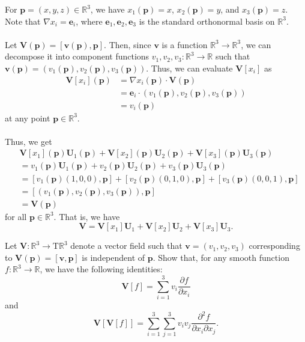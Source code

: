 \documentclass[12 pt, letterpaper]{hmcpset}
\begin{document}
\begin{solution}
	For $\mathbf p = (x, y, z) \in \mathbb R^3$, we have $x_1(\mathbf p) = x$, $x_2(\mathbf p) = y$, and $x_3(\mathbf p) = z$. Note that $\nabla x_i = \mathbf e_i$, where $\mathbf e_1, \mathbf e_2, \mathbf e_3$ is the standard orthonormal basis on $\mathbb R^3$. \\\\
	Let $\mathbf V(\mathbf p) = [\mathbf v(\mathbf p), \mathbf p]$. Then, since $\mathbf v$ is a function $\mathbb R^3 \to \mathbb R^3$, we can decompose it into component functions $v_1, v_2, v_3 : \mathbb R^3 \to \mathbb R$ such that $\mathbf v(\mathbf p) = (v_1(\mathbf p), v_2(\mathbf p), v_3(\mathbf p))$. Thus, we can evaluate $\mathbf V[x_i]$ as
	\[
		\begin{split}
			\mathbf V[x_i](\mathbf p) & = \nabla x_i(\mathbf p) \cdot \mathbf V(\mathbf p) \\
						  & = \mathbf e_i \cdot (v_1(\mathbf p), v_2(\mathbf p), v_3(\mathbf p)) \\
						  & = v_i(\mathbf p)
		\end{split}
	\]
	at any point $\mathbf p \in \mathbb R^3$. \\\\
	Thus, we get
	\[
		\begin{split}
			& \mathbf V[x_1] (\mathbf p) \mathbf U_1 (\mathbf p) + \mathbf V[x_2] (\mathbf p) \mathbf U_2 (\mathbf p) + \mathbf V[x_3] (\mathbf p) \mathbf U_3 (\mathbf p) \\
			& = v_1 (\mathbf p) \mathbf U_1 (\mathbf p) + v_2 (\mathbf p) \mathbf U_2 (\mathbf p) + v_3 (\mathbf p) \mathbf U_3 (\mathbf p) \\
			& = [v_1(\mathbf p)(1, 0, 0), \mathbf p] + [v_2 (\mathbf p) (0, 1, 0), \mathbf p] + [v_3(\mathbf p)(0, 0, 1), \mathbf p] \\
			& = [(v_1(\mathbf p), v_2(\mathbf p), v_3(\mathbf p)), \mathbf p] \\
			& = \mathbf V(\mathbf p)
		\end{split}
	\]
	for all $\mathbf p \in \mathbb R^3$. That is, we have
	\[
		\mathbf V = \mathbf V[x_1] \mathbf U_1 + \mathbf V[x_2] \mathbf U_2 + \mathbf V[x_3] \mathbf U_3.
	\]
\end{solution}

\pagebreak

\begin{problem}[Problem 4.]
	Let $\mathbf V : \mathbb R^3 \to \mathrm T \mathbb R^3$ denote a vector field such that $\mathbf v = (v_1, v_2, v_3)$ corresponding to $\mathbf V(\mathbf p) = [\mathbf v, \mathbf p]$ is independent of $\mathbf p$. Show that, for any smooth function $f : \mathbb R^3 \to \mathbb R$, we have the following identities:
	\[
		\mathbf V[f] = \sum_{i = 1}^3 v_i \frac{\partial f}{\partial x_i}
	\]
	and
	\[
		\mathbf V[\mathbf V[f]] = \sum_{i = 1}^3 \sum_{j = 1}^3 v_i v_j \frac{\partial^2 f}{\partial x_i \partial x_j}.
	\]
\end{problem}
\end{document}
